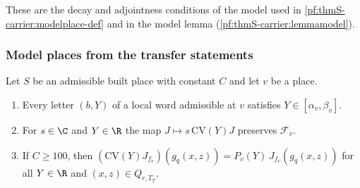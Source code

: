 These are the decay and adjointness conditions of the model used in \cref{pf:thmS-carrier:modelplace-def} and in the model
lemma (\cref{pf:thmS-carrier:lemmamodel}).

\subsubsection{Model places from the transfer statements}

\begin{lemma}\label{pf:thmS-carrier:localfacts}
Let $S$ be an admissible built place with constant $C$ and let $v$ be a place.
\begin{enumerate}[label=(\roman*)]
\item Every letter $(b,Y)$ of a local word admissible at $v$ satisfies $Y\in[\alpha_v,\beta_v]$.
\item For $s\in\C$ and $Y\in\R$ the map $J\mapsto s\,\mathrm{CV}(Y)J$ preserves $\mathcal F_v$.
\item If $C\ge100$, then $(\mathrm{CV}(Y)J_{f_v})(g_q(x,z))=P_v(Y)\,J_{f_v}(g_q(x,z))$ for all $Y\in\R$ and
  $(x,z)\in Q_{r,T_T}$.
\end{enumerate}
\end{lemma}

